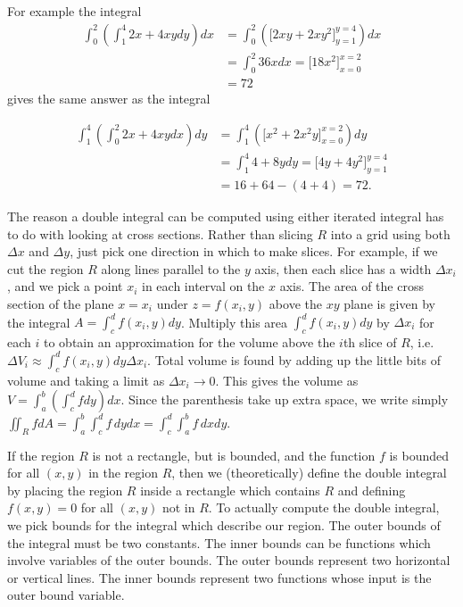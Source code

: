 \begin{example}
  For example the integral 
  \begin{align*}
    \int_0^2 \left(\int_1^4 2x+4xy dy\right)dx
  &=\int_0^2 \left( \big[2xy+2xy^2 \big]_{y=1}^{y=4}\right)dx \\
  &=\int_0^2 36x dx =  \big[18x^2\big]_{x=0}^{x=2} \\
  &= 72    
  \end{align*}
gives the same answer as the integral 

\begin{align*}
  \int_1^4\left(\int_0^2 2x+4xy dx\right)dy &= \int_1^4\left(\big[x^2+2x^2y
    \big]_{x=0}^{x=2}\right)dy \\
  &= \int_1^4 4+8ydy = \big[4y+4y^2 \big]_{y=1}^{y=4} \\
  &=
  16+64 - (4 + 4) = 72.  
\end{align*}
\end{example}

The reason a double integral can be computed using either iterated
integral has to do with looking at cross sections.  Rather than
slicing $R$ into a grid using both $\Delta x$ and $\Delta y$, just pick one
direction in which to make slices.  For example, if we cut the region
$R$ along lines parallel to the $y$ axis, then each slice has a width
$\Delta x_i$, and we pick a point $x_i$ in each interval on the $x$ axis.
The area of the cross section of the plane $x=x_i$ under $z=f(x_i,y)$
above the $xy$ plane is given by the integral $A=\int_c^d f(x_i,y)dy$.
Multiply this area $\int_c^d f(x_i,y)dy$ by $\Delta x_i$ for each $i$ to
obtain an approximation for the volume above the $i$th slice of $R$,
i.e. $\Delta V_i\approx \int_c^d f(x_i,y)dy\Delta x_i$. Total volume is found by adding
up the little bits of volume and taking a limit as $\Delta x_i\to 0$. This
gives the volume as 
$V=\int_a^b \left(\int_c^d f dy\right)dx$.  Since the parenthesis take up
extra space, we write simply $\iint_R fdA = \int_a^b \int_c^d f \,dydx = \int_c^d
\int_a^b f \,dxdy$.

If the region $R$ is not a rectangle, but is bounded, and the function
$f$ is bounded for all $(x,y)$ in the region $R$, then we
(theoretically) define the
double integral by placing the region $R$ inside a rectangle which
contains $R$ and defining $f(x,y)=0$ for all $(x,y)$ not in $R$.  To
actually compute the double integral, we pick bounds for the integral which
describe our region.  The outer bounds of the integral must be two
constants. The inner bounds can be functions which involve variables
of the outer bounds.  The outer bounds represent two horizontal or
vertical lines.  The inner bounds represent two functions whose input
is the outer bound variable. 

